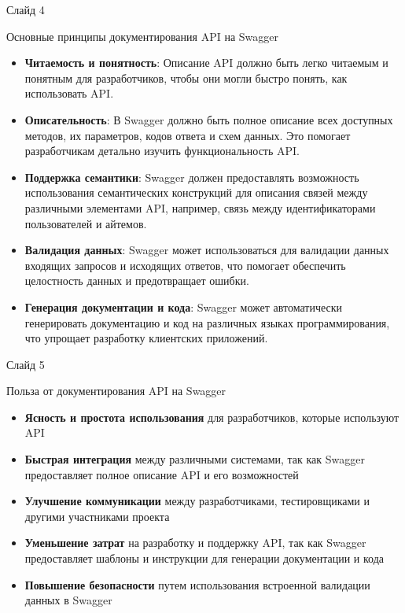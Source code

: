 \documentclass[
  ignorenonframetext,
  aspectratio=169,
  aspectratio=169]{beamer}
\providecommand{\tightlist}{%
  \setlength{\itemsep}{0pt}\setlength{\parskip}{0pt}}
\begin{document}
\begin{frame}{Слайд 4}
\protect\hypertarget{ux441ux43bux430ux439ux434-4-1}{}
\begin{block}{Основные принципы документирования API на Swagger}
\protect\hypertarget{ux43eux441ux43dux43eux432ux43dux44bux435-ux43fux440ux438ux43dux446ux438ux43fux44b-ux434ux43eux43aux443ux43cux435ux43dux442ux438ux440ux43eux432ux430ux43dux438ux44f-api-ux43dux430-swagger}{}
\begin{itemize}
\tightlist
\item
  \textbf{Читаемость и понятность}: Описание API должно быть легко
  читаемым и понятным для разработчиков, чтобы они могли быстро понять,
  как использовать API.
\item
  \textbf{Описательность}: В Swagger должно быть полное описание всех
  доступных методов, их параметров, кодов ответа и схем данных. Это
  помогает разработчикам детально изучить функциональность API.
\item
  \textbf{Поддержка семантики}: Swagger должен предоставлять возможность
  использования семантических конструкций для описания связей между
  различными элементами API, например, связь между идентификаторами
  пользователей и айтемов.
\item
  \textbf{Валидация данных}: Swagger может использоваться для валидации
  данных входящих запросов и исходящих ответов, что помогает обеспечить
  целостность данных и предотвращает ошибки.
\item
  \textbf{Генерация документации и кода}: Swagger может автоматически
  генерировать документацию и код на различных языках программирования,
  что упрощает разработку клиентских приложений.
\end{itemize}
\end{block}
\end{frame}

\begin{frame}{Слайд 5}
\protect\hypertarget{ux441ux43bux430ux439ux434-5-1}{}
\begin{block}{Польза от документирования API на Swagger}
\protect\hypertarget{ux43fux43eux43bux44cux437ux430-ux43eux442-ux434ux43eux43aux443ux43cux435ux43dux442ux438ux440ux43eux432ux430ux43dux438ux44f-api-ux43dux430-swagger}{}
\begin{itemize}
\tightlist
\item
  \textbf{Ясность и простота использования} для разработчиков, которые
  используют API
\item
  \textbf{Быстрая интеграция} между различными системами, так как
  Swagger предоставляет полное описание API и его возможностей
\item
  \textbf{Улучшение коммуникации} между разработчиками, тестировщиками и
  другими участниками проекта
\item
  \textbf{Уменьшение затрат} на разработку и поддержку API, так как
  Swagger предоставляет шаблоны и инструкции для генерации документации
  и кода
\item
  \textbf{Повышение безопасности} путем использования встроенной
  валидации данных в Swagger
\end{itemize}
\end{block}
\end{frame}
\end{document}
